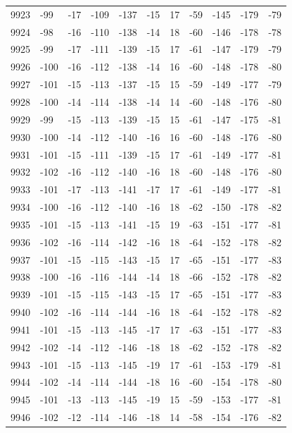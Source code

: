 \begin{table}[H]
\begin{tabular}{lllllllllll}
9923 & -99 & -17 & -109 & -137 & -15 & 17 & -59 & -145 & -179 & -79 \\
9924 & -98 & -16 & -110 & -138 & -14 & 18 & -60 & -146 & -178 & -78 \\
9925 & -99 & -17 & -111 & -139 & -15 & 17 & -61 & -147 & -179 & -79 \\
9926 & -100 & -16 & -112 & -138 & -14 & 16 & -60 & -148 & -178 & -80 \\
9927 & -101 & -15 & -113 & -137 & -15 & 15 & -59 & -149 & -177 & -79 \\
9928 & -100 & -14 & -114 & -138 & -14 & 14 & -60 & -148 & -176 & -80 \\
9929 & -99 & -15 & -113 & -139 & -15 & 15 & -61 & -147 & -175 & -81 \\
9930 & -100 & -14 & -112 & -140 & -16 & 16 & -60 & -148 & -176 & -80 \\
9931 & -101 & -15 & -111 & -139 & -15 & 17 & -61 & -149 & -177 & -81 \\
9932 & -102 & -16 & -112 & -140 & -16 & 18 & -60 & -148 & -176 & -80 \\
9933 & -101 & -17 & -113 & -141 & -17 & 17 & -61 & -149 & -177 & -81 \\
9934 & -100 & -16 & -112 & -140 & -16 & 18 & -62 & -150 & -178 & -82 \\
9935 & -101 & -15 & -113 & -141 & -15 & 19 & -63 & -151 & -177 & -81 \\
9936 & -102 & -16 & -114 & -142 & -16 & 18 & -64 & -152 & -178 & -82 \\
9937 & -101 & -15 & -115 & -143 & -15 & 17 & -65 & -151 & -177 & -83 \\
9938 & -100 & -16 & -116 & -144 & -14 & 18 & -66 & -152 & -178 & -82 \\
9939 & -101 & -15 & -115 & -143 & -15 & 17 & -65 & -151 & -177 & -83 \\
9940 & -102 & -16 & -114 & -144 & -16 & 18 & -64 & -152 & -178 & -82 \\
9941 & -101 & -15 & -113 & -145 & -17 & 17 & -63 & -151 & -177 & -83 \\
9942 & -102 & -14 & -112 & -146 & -18 & 18 & -62 & -152 & -178 & -82 \\
9943 & -101 & -15 & -113 & -145 & -19 & 17 & -61 & -153 & -179 & -81 \\
9944 & -102 & -14 & -114 & -144 & -18 & 16 & -60 & -154 & -178 & -80 \\
9945 & -101 & -13 & -113 & -145 & -19 & 15 & -59 & -153 & -177 & -81 \\
9946 & -102 & -12 & -114 & -146 & -18 & 14 & -58 & -154 & -176 & -82 \\

\end{tabular}
\end{table}

